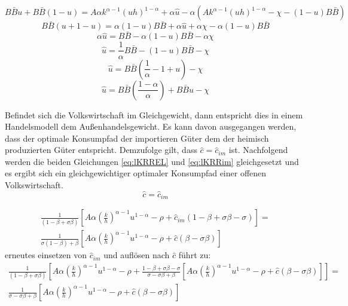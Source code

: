 \begin{equation}
B \bar{B} u + B \bar{B} (1- u) = A \alpha k^{\alpha -1} (uh)^{1- \alpha} + \alpha \hat{u} - \alpha (Ak^{\alpha -1} (uh)^{1-\alpha} - \chi - (1-u) B \bar{B}) 
\end{equation}
\begin{equation}
B \bar{B} (u +1 - u)= \alpha (1-u)B \bar{B} + \alpha \hat{u}+ \alpha \chi -\alpha (1-u)B \bar{B}
\end{equation}
\begin{equation}
\alpha \hat{u}=B \bar{B} -\alpha (1-u)B \bar{B} - \alpha \chi  
\end{equation}
\begin{equation}
\hat{u}=\frac{1}{\alpha}B \bar{B} - (1-u)B \bar{B} - \chi 
\end{equation}
\begin{equation}
\hat{u}  =  B \bar{B} (\frac{1}{\alpha}- 1+u)- \chi 
\end{equation}
\begin{equation}
\boxed{\hat{u} = B \bar{B} \left(\frac{1- \alpha}{\alpha}\right) + B \bar{B} u - \chi }
\end{equation}


Befindet sich die Volkswirtschaft im Gleichgewicht, dann entspricht dies in einem Handelsmodell dem Au{\ss}enhandelsgewicht. Es kann davon ausgegangen werden, dass der optimale Konsumpfad der importieren Güter dem der heimisch produzierten Güter entspricht. Demzufolge gilt, dass $\hat{c}=\hat{c}_{im}$ ist. Nachfolgend werden die beiden Gleichungen  \eqref{eq:lKRREL} und \eqref{eq:lKRRim} gleichgesetzt und es ergibt sich ein gleichgewichtiger optimaler Konsumpfad einer offenen Volkswirtschaft. 
\begin{equation}
\hat{c}=\hat{c}_{im}
\end{equation}



\begin{equation}
\begin{split}
\frac{1}{(1-\beta+\sigma\beta)}\left[A\alpha \left(\frac{k}{h}\right)^{\alpha-1}u^{1- \alpha}-\rho+\hat{c}_{im}(1-\beta+\sigma\beta-\sigma)\right]=\\
\frac{1}{\sigma(1-\beta)+\beta}\left[A\alpha \left(\frac{k}{h}\right)^{\alpha-1}u^{1- \alpha}-\rho+\hat{c}(\beta-\sigma\beta)\right]
\end{split}
\end{equation}
erneutes einsetzen von $\hat{c}_{im}$ und auflösen nach $\hat{c}$ führt zu: 
\begin{equation*}
\begin{split}
\frac{1}{(1-\beta+\sigma\beta)}\left[A\alpha \left(\frac{k}{h}\right)^{\alpha-1}u^{1- \alpha}-\rho+\frac{1-\beta+\sigma\beta-\sigma}{\sigma-\sigma\beta+\beta}\left[A\alpha \left(\frac{k}{h}\right)^{\alpha-1}u^{1- \alpha}-\rho+\hat{c}(\beta-\sigma\beta)\right]\right]=\\
\frac{1}{\sigma-\sigma\beta+\beta}\left[A\alpha \left(\frac{k}{h}\right)^{\alpha-1}u^{1- \alpha}-\rho+\hat{c}(\beta-\sigma\beta)\right]
\end{split}
\end{equation*}

